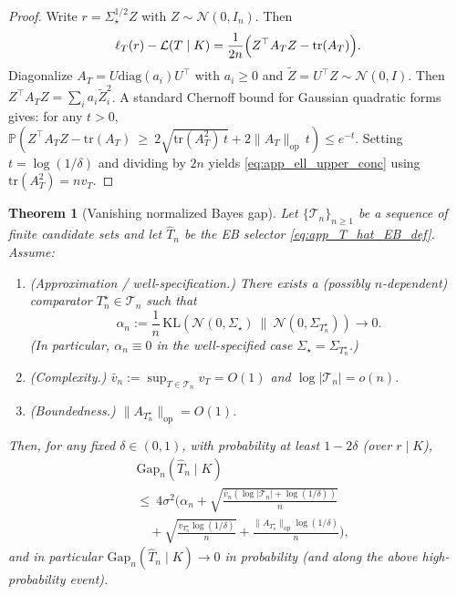 \documentclass{article}
\theoremstyle{plain}
\newtheorem{theorem}{Theorem}[section]
\theoremstyle{definition}
\theoremstyle{remark}
\begin{document}
\begin{proof}
Write $r=\Sigma_\star^{1/2}Z$ with $Z\sim\mathcal N(0,I_n)$. Then
\[
\ell_T(r)-\mathcal L(T\mid K)=\frac{1}{2n}\Bigl(Z^\top A_T Z-\mathrm{tr}(A_T)\Bigr).
\]
Diagonalize $A_T=U\mathrm{diag}(a_i)U^\top$ with $a_i\ge 0$ and $\widetilde Z=U^\top Z\sim\mathcal N(0,I)$.
Then $Z^\top A_T Z=\sum_i a_i\widetilde Z_i^2$.
A standard Chernoff bound for Gaussian quadratic forms~\citep{Vershynin_2018}
gives: for any $t>0$,
$\mathbb P\!\left(
Z^\top A_T Z-\mathrm{tr}(A_T)\ \ge\ 2\sqrt{\mathrm{tr}(A_T^2)\,t}+2\|A_T\|_{\mathrm{op}}\,t
\right)
\le e^{-t}.$
Setting $t=\log(1/\delta)$ and dividing by $2n$ yields \eqref{eq:app_ell_upper_conc}
using $\mathrm{tr}(A_T^2)=nv_T$.
\end{proof}

\begin{theorem}[Vanishing normalized Bayes gap]
\label{prop:app_gap_vanish}
Let $\{\mathcal T_n\}_{n\ge 1}$ be a sequence of finite candidate sets and let $\widehat T_n$ be the EB selector
\eqref{eq:app_T_hat_EB_def}. Assume:
\begin{enumerate}[label=\textbf{(A\arabic*)}, leftmargin=*, itemsep=0pt, parsep=0pt, topsep=0pt, partopsep=0pt, before=\vspace{-0.4\baselineskip}]
\item (Approximation / well-specification.) There exists a (possibly $n$-dependent) comparator
$T_n^\star\in\mathcal T_n$ such that
\[
\alpha_n:=\frac1n\,\mathrm{KL}\!\left(\mathcal N(0,\Sigma_\star)\ \|\ \mathcal N(0,\Sigma_{T_n^\star})\right)\to 0.
\]
(In particular, $\alpha_n\equiv 0$ in the well-specified case $\Sigma_\star=\Sigma_{T_n^\star}$.)
\item (Complexity.) $\bar v_n:=\sup_{T\in\mathcal T_n}v_T=O(1)$ and $\log|\mathcal T_n|=o(n)$.
\item (Boundedness.) $\|A_{T_n^\star}\|_{\mathrm{op}}=O(1)$.
\end{enumerate}
Then, for any fixed $\delta\in(0,1)$, with probability at least $1-2\delta$ (over $r\mid K$),
\begin{align}
&\mathrm{Gap}_n(\widehat T_n\mid K) \\
&\le\
4\sigma^2\Big(
\alpha_n
+
\sqrt{\frac{\bar v_n(\log|\mathcal T_n|+\log(1/\delta))}{n}}\\
&\quad +
\sqrt{\frac{v_{T_n^\star}\log(1/\delta)}{n}}
+
\frac{\|A_{T_n^\star}\|_{\mathrm{op}}\log(1/\delta)}{n}
\Big),
\label{eq:app_gap_vanish_bound}
\end{align}
and in particular $\mathrm{Gap}_n(\widehat T_n\mid K)\to 0$ in probability (and along the above high-probability event).
    
\end{theorem}
\end{document}
